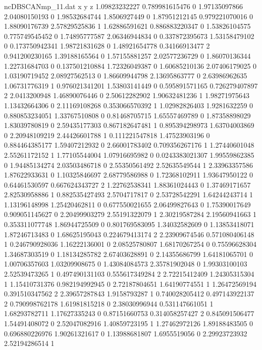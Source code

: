 \begin{filecontents}{ncDBSCANmp_11.dat}
x y z
1.09823232227 0.789981615476 0
1.97135097866 2.04080150193 0
1.98532684744 1.8506927449 0
1.87951212145 0.979221070016 0
1.88090176739 2.57829525836 1
1.62886591621 0.886883220347 0
1.53826104575 0.775749545452 0
1.74895777587 2.06346944834 0
0.337872395673 1.53158479102 0
0.173750942341 1.98721831628 0
1.48921654778 0.34166913477 2
0.941200230165 1.39188165564 0
1.57155881257 2.02577236729 0
1.86070136344 1.22731684703 0
0.137501210884 1.72326049387 0
1.60685210136 2.07406179025 0
1.03190719452 2.08927562513 0
1.86609944798 2.13695863777 0
2.63986962635 1.06731776319 1
0.976021341201 1.53803141449 0
0.595891571165 0.726279407897 2
2.0413200948 1.46890076446 0
2.50612282902 1.90632481236 1
1.98271975643 1.13432664306 0
2.11169108268 0.353066570392 1
1.02982826403 1.9281632259 0
0.880853234051 1.33767510808 0
0.81468705715 1.65557469789 0
1.87358898029 1.83039780819 0
2.59435177303 0.867182647481 1
0.895394298973 1.63704003869 0
2.20948109219 2.44426601788 1
0.111221547818 1.47523903196 0
0.884464385177 1.59407212932 0
2.66001783402 0.709356267176 1
1.27440601048 2.55261172152 1
1.77105544004 1.07916695982 0
0.0243383021307 1.99559862385 0
1.94485134274 2.03503486718 0
2.55350561492 2.52635549544 1
2.33963357586 1.87622933631 0
1.10325846697 2.68779586988 0
1.72368102911 1.93647950122 0
0.64461530597 0.667624343727 2
1.22762538341 1.88361024443 0
1.37469171657 2.82530958886 1
0.882535427493 2.5704717817 0
2.53728542291 1.64244243714 1
1.13196148998 1.25420462811 0
0.677550021655 2.06499827643 0
1.75390017649 0.909051145627 0
2.20499903279 2.55191322079 1
2.30219587284 2.19560941663 1
0.353311077748 1.86944725509 0
0.801769583095 1.34032582609 0
1.13853418071 1.87246713483 0
1.68625195043 0.224679413174 2
2.23909674546 0.571080406148 1
0.246790928036 1.16222136001 0
2.08525780807 1.68170267254 0
0.75596628304 1.34687303519 0
1.18134285782 2.67403628891 0
2.14355686799 1.64181065701 0
1.00706357603 1.03209908675 0
1.43084084573 2.35781902048 0
1.99303100103 2.52539473265 1
0.497490131103 0.555617349284 2
2.72215412409 1.24305315304 1
1.15410731376 0.982194992945 0
2.72187804651 1.64190774551 1
1.26472569194 0.391510347562 2
2.39657287843 1.9158793287 1
0.740028205412 0.497143922137 2
0.790998762178 1.61981815218 0
2.38030996944 0.531147661051 1
1.68293782711 1.17627335243 0
0.87151660753 0.314058257427 2
0.845091506477 1.54491408072 0
2.52047082916 1.40859723195 1
1.27462972126 1.89188483505 0
0.696880226976 1.90261321617 0
1.13988681807 1.6955519056 0
2.29923723932 2.52194286514 1

\end{filecontents}
